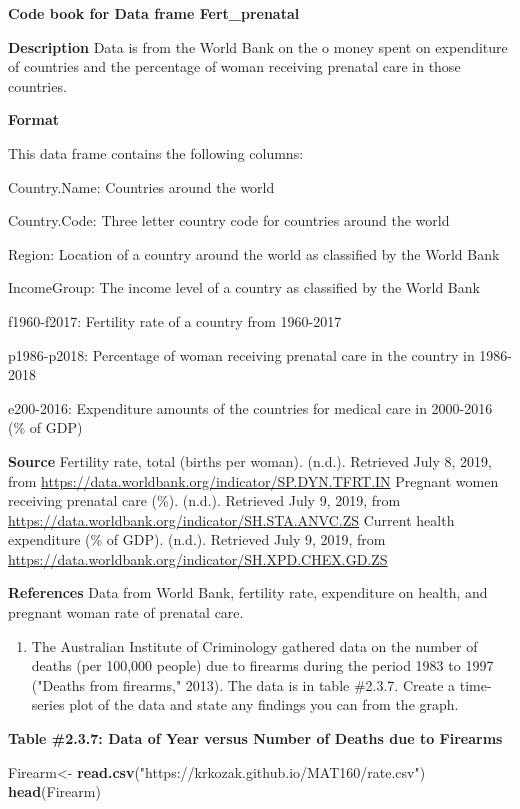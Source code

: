 \documentclass[]{book}
\newenvironment{Shaded}{\begin{snugshade}}{\end{snugshade}}
\newcommand{\KeywordTok}[1]{\textcolor[rgb]{0.13,0.29,0.53}{\textbf{#1}}}
\newcommand{\NormalTok}[1]{#1}
\newcommand{\StringTok}[1]{\textcolor[rgb]{0.31,0.60,0.02}{#1}}
\providecommand{\tightlist}{%
  \setlength{\itemsep}{0pt}\setlength{\parskip}{0pt}}
\begin{document}
\textbf{Code book for Data frame Fert\_prenatal}

\textbf{Description}
Data is from the World Bank on the o money spent on expenditure of countries and the percentage of woman receiving prenatal care in those countries.

\textbf{Format}

This data frame contains the following columns:

Country.Name: Countries around the world

Country.Code: Three letter country code for countries around the world

Region: Location of a country around the world as classified by the World Bank

IncomeGroup: The income level of a country as classified by the World Bank

f1960-f2017: Fertility rate of a country from 1960-2017

p1986-p2018: Percentage of woman receiving prenatal care in the country in 1986-2018

e200-2016: Expenditure amounts of the countries for medical care in 2000-2016 (\% of GDP)

\textbf{Source}
Fertility rate, total (births per woman). (n.d.). Retrieved July 8, 2019, from \url{https://data.worldbank.org/indicator/SP.DYN.TFRT.IN}
Pregnant women receiving prenatal care (\%). (n.d.). Retrieved July 9, 2019, from \url{https://data.worldbank.org/indicator/SH.STA.ANVC.ZS}
Current health expenditure (\% of GDP). (n.d.). Retrieved July 9, 2019, from \url{https://data.worldbank.org/indicator/SH.XPD.CHEX.GD.ZS}

\textbf{References}
Data from World Bank, fertility rate, expenditure on health, and pregnant woman rate of prenatal care.

\begin{enumerate}
\def\labelenumi{\arabic{enumi}.}
\setcounter{enumi}{4}
\tightlist
\item
  The Australian Institute of Criminology gathered data on the number of deaths (per 100,000 people) due to firearms during the period 1983 to 1997 ("Deaths from firearms," 2013). The data is in table \#2.3.7. Create a time-series plot of the data and state any findings you can from the graph.
\end{enumerate}

\textbf{Table \#2.3.7: Data of Year versus Number of Deaths due to Firearms}

\begin{Shaded}
\begin{Highlighting}[]
\NormalTok{Firearm<-}\StringTok{ }\KeywordTok{read.csv}\NormalTok{(}\StringTok{"https://krkozak.github.io/MAT160/rate.csv"}\NormalTok{)}
\KeywordTok{head}\NormalTok{(Firearm)}
\end{Highlighting}
\end{Shaded}
\end{document}
